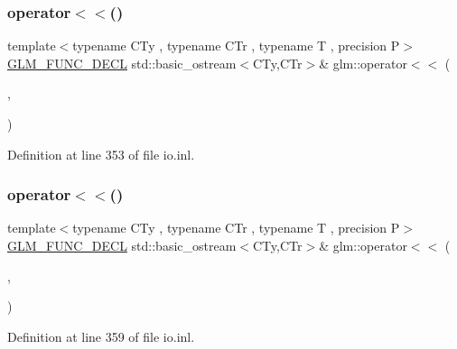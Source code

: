 \subsubsection{\texorpdfstring{operator$<$$<$()}{operator<<()}\hspace{0.1cm}{\footnotesize\ttfamily [12/15]}}
{\footnotesize\ttfamily template$<$typename C\+Ty , typename C\+Tr , typename T , precision P$>$ \\
\mbox{\hyperlink{setup_8hpp_ab2d052de21a70539923e9bcbf6e83a51}{G\+L\+M\+\_\+\+F\+U\+N\+C\+\_\+\+D\+E\+CL}} std\+::basic\+\_\+ostream$<$C\+Ty,C\+Tr$>$\& glm\+::operator$<$$<$ (\begin{DoxyParamCaption}\item[{std\+::basic\+\_\+ostream$<$ C\+Ty, C\+Tr $>$ \&}]{,  }\item[{\mbox{\hyperlink{structglm_1_1tmat4x2}{tmat4x2}}$<$ T, P $>$ const \&}]{ }\end{DoxyParamCaption})}



Definition at line 353 of file io.\+inl.

\mbox{\label{group__gtx__io_gaca75b14a0534a02860349a114a10aa44}} 
\subsubsection{\texorpdfstring{operator$<$$<$()}{operator<<()}\hspace{0.1cm}{\footnotesize\ttfamily [13/15]}}
{\footnotesize\ttfamily template$<$typename C\+Ty , typename C\+Tr , typename T , precision P$>$ \\
\mbox{\hyperlink{setup_8hpp_ab2d052de21a70539923e9bcbf6e83a51}{G\+L\+M\+\_\+\+F\+U\+N\+C\+\_\+\+D\+E\+CL}} std\+::basic\+\_\+ostream$<$C\+Ty,C\+Tr$>$\& glm\+::operator$<$$<$ (\begin{DoxyParamCaption}\item[{std\+::basic\+\_\+ostream$<$ C\+Ty, C\+Tr $>$ \&}]{,  }\item[{\mbox{\hyperlink{structglm_1_1tmat4x3}{tmat4x3}}$<$ T, P $>$ const \&}]{ }\end{DoxyParamCaption})}



Definition at line 359 of file io.\+inl.

\mbox{\label{group__gtx__io_ga6683acc91ba7ce5822e25a2517550bff}} 
